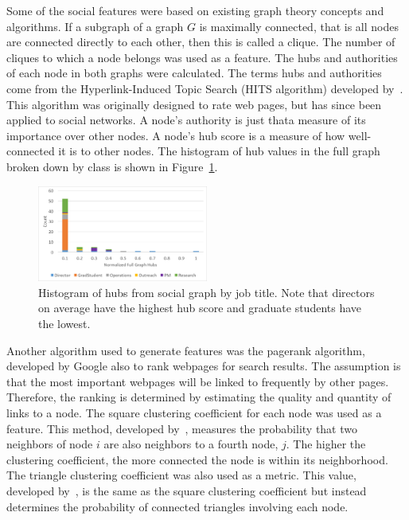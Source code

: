 \documentclass{article}
\begin{document}
Some of the social features were based on existing graph theory concepts and algorithms. If a subgraph of a graph $G$ is maximally connected, that is all nodes are connected directly to each other, then this is called a clique.  The number of cliques to which a node belongs was used as a feature.  The hubs and authorities of each node in both graphs were calculated.  The terms hubs and authorities come from the Hyperlink-Induced Topic Search (HITS algorithm) developed by~\cite{kleinberg_hubs_1999}.  This algorithm was originally designed to rate web pages, but has since been applied to social networks. A node's authority is just that\textemdash{}a measure of its importance over other nodes.  A node's hub score is a measure of how well-connected it is to other nodes.  The histogram of hub values in the full graph broken down by class is shown in Figure~\ref{fig:social_ex_hist}.  
\begin{figure}[H]
    \centering
        \includegraphics[width=0.5\textwidth]{Hubs_hist}
        \caption{Histogram of hubs from social graph by job title.  Note that directors on average have the highest hub score and graduate students have the lowest.}
        \label{fig:social_ex_hist}
\end{figure}

Another algorithm used to generate features was the pagerank algorithm, developed by Google 
\cite{page_pagerank_1999} also to rank webpages for search results.  The assumption is that the most important webpages will be linked to frequently by other pages.  Therefore, the ranking is determined by estimating the quality and quantity of links to a node.  The square clustering coefficient for each node was used as a feature.  This method, developed by~\cite{lind_cycles_2005}, measures the probability that two neighbors of node $i$ are also neighbors to a fourth node, $j$.  The higher the clustering coefficient, the more connected the node is within its neighborhood.  The triangle clustering coefficient was also used as a metric.  This value, developed by~\cite{saramaki_generalizations_2007}, is the same as the square clustering coefficient but instead determines the probability of connected triangles involving each node.
\end{document}
